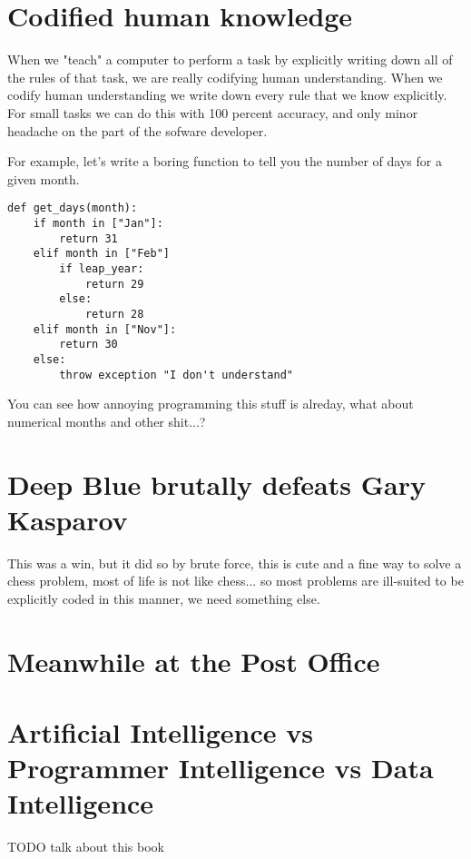 \section{Codified human knowledge}

When we "teach" a computer to perform a task by explicitly writing down all of the rules of that task, we are really codifying human understanding. When we codify human understanding we write down every rule that we know explicitly. For small tasks we can do this with 100 percent accuracy, and only minor headache on the part of the sofware developer. 

For example, let's write a boring function to tell you the number of days for a given month. 

\begin{lstlisting}[style=kaolstplain,linewidth=1.5\textwidth]
def get_days(month):
	if month in ["Jan"]:
		return 31
	elif month in ["Feb"]
		if leap_year:
			return 29
		else:
			return 28
	elif month in ["Nov"]:
		return 30
	else:
		throw exception "I don't understand"
\end{lstlisting}

You can see how annoying programming this stuff is alreday, what about numerical months and other shit...?

\section{Deep Blue brutally defeats Gary Kasparov}

This was a win, but it did so by brute force, this is cute and a fine way to solve a chess problem, most of life is not like chess... so most problems are ill-suited to be explicitly coded in this manner, we need something else.

\section{Meanwhile at the Post Office}



\section{Artificial Intelligence vs Programmer Intelligence vs Data Intelligence}


TODO talk about this book 


